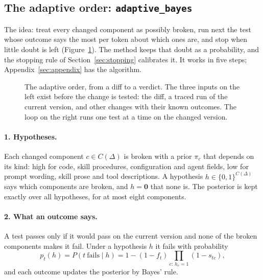 \documentclass[11pt,a4paper]{article}
\newcommand{\strat}[1]{\texttt{#1}}
\begin{document}
\subsection{The adaptive order: \strat{adaptive\_bayes}}
\label{sec:adaptive}

The idea: treat every changed component as possibly broken, run next the test whose outcome says the most per
token about which ones are, and stop when little doubt is left (Figure~\ref{fig:overview}). The method keeps that
doubt as a probability, and the stopping rule of Section~\ref{sec:stopping} calibrates it. It works in five steps;
Appendix~\ref{sec:appendix} has the algorithm.

\begin{figure}[!htbp]
  \centering
  \resizebox{0.9\textwidth}{!}{}
  \caption{The adaptive order, from a diff to a verdict. The three inputs on the left exist before the
  change is tested: the diff, a traced run of the current version, and other changes with their known
  outcomes. The loop on the right runs one test at a time on the changed version.}
  \label{fig:overview}
\end{figure}

\paragraph{1. Hypotheses.} Each changed component $c \in C(\Delta)$ is broken with a prior $\pi_c$ that depends on
its kind: high for code, skill procedures, configuration and agent fields, low for prompt wording, skill prose and
tool descriptions. A hypothesis $h \in \{0,1\}^{C(\Delta)}$ says which components are broken, and $h = \mathbf{0}$
that none is. The posterior is kept exactly over all hypotheses, for at most eight components.

\paragraph{2. What an outcome says.} A test passes only if it would pass on the current version and none of the
broken components makes it fail. Under a hypothesis $h$ it fails with probability
\begin{equation}
  p_t(h) = P(t\ \text{fails} \mid h) = 1 - (1 - f_t) \prod_{c:\, h_c = 1} (1 - s_{tc}),
  \label{eq:likelihood}
\end{equation}
and each outcome updates the posterior by Bayes' rule.
\end{document}
